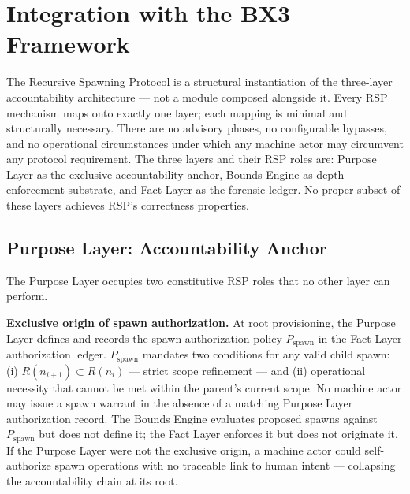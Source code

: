 \section{Integration with the BX3 Framework}
\label{sec:rs-integration}

The Recursive Spawning Protocol is a structural instantiation of the \bxthree{} three-layer accountability architecture — not a module composed alongside it. Every RSP mechanism maps onto exactly one \bxthree{} layer; each mapping is minimal and structurally necessary. There are no advisory phases, no configurable bypasses, and no operational circumstances under which any machine actor may circumvent any protocol requirement. The three layers and their RSP roles are: Purpose Layer as the exclusive accountability anchor, Bounds Engine as depth enforcement substrate, and Fact Layer as the forensic ledger. No proper subset of these layers achieves RSP's correctness properties.

\subsection{Purpose Layer: Accountability Anchor}
\label{sec:rs-purpose-anchor}

The Purpose Layer occupies two constitutive RSP roles that no other layer can perform.

\medskip
\noindent\textbf{Exclusive origin of spawn authorization.} At root provisioning, the Purpose Layer defines and records the spawn authorization policy $P_{\mathrm{spawn}}$ in the Fact Layer authorization ledger. $P_{\mathrm{spawn}}$ mandates two conditions for any valid child spawn: (i) $R(n_{i+1}) \subset R(n_i)$ — strict scope refinement — and (ii) operational necessity that cannot be met within the parent's current scope. No machine actor may issue a spawn warrant in the absence of a matching Purpose Layer authorization record. The Bounds Engine evaluates proposed spawns against $P_{\mathrm{spawn}}$ but does not define it; the Fact Layer enforces it but does not originate it. If the Purpose Layer were not the exclusive origin, a machine actor could self-authorize spawn operations with no traceable link to human intent — collapsing the accountability chain at its root.

